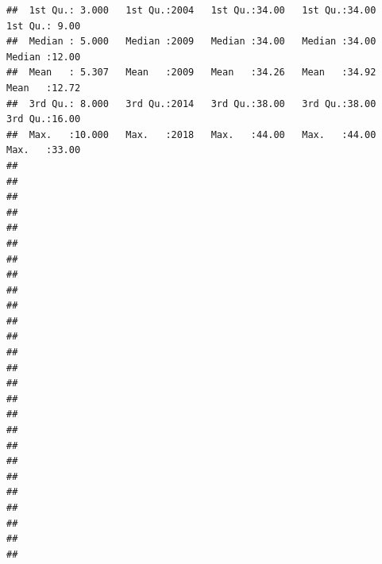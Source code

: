 \documentclass{article}\usepackage[]{graphicx}\usepackage[]{color}
\makeatletter
\newenvironment{kframe}{%
 \def\at@end@of@kframe{}%
 \ifinner\ifhmode%
  \def\at@end@of@kframe{\end{minipage}}%
  \begin{minipage}{\columnwidth}%
 \fi\fi%
 \def\FrameCommand##1{\hskip\@totalleftmargin \hskip-\fboxsep
 \colorbox{shadecolor}{##1}\hskip-\fboxsep
     \hskip-\linewidth \hskip-\@totalleftmargin \hskip\columnwidth}%
 \MakeFramed {\advance\hsize-\width
   \@totalleftmargin\z@ \linewidth\hsize
   \@setminipage}}%
 {\par\unskip\endMakeFramed%
 \at@end@of@kframe}
\newenvironment{knitrout}{}{} %
\makeatother
\begin{document}
\begin{knitrout}
\begin{kframe}
\begin{verbatim}
##  1st Qu.: 3.000   1st Qu.:2004   1st Qu.:34.00   1st Qu.:34.00   1st Qu.: 9.00  
##  Median : 5.000   Median :2009   Median :34.00   Median :34.00   Median :12.00  
##  Mean   : 5.307   Mean   :2009   Mean   :34.26   Mean   :34.92   Mean   :12.72  
##  3rd Qu.: 8.000   3rd Qu.:2014   3rd Qu.:38.00   3rd Qu.:38.00   3rd Qu.:16.00  
##  Max.   :10.000   Max.   :2018   Max.   :44.00   Max.   :44.00   Max.   :33.00  
##                                                                                 
##                                                                                 
##                                                                                 
##                                                                                 
##                                                                                 
##                                                                                 
##                                                                                 
##                                                                                 
##                                                                                 
##                                                                                 
##                                                                                 
##                                                                                 
##                                                                                 
##                                                                                 
##                                                                                 
##                                                                                 
##                                                                                 
##                                                                                 
##                                                                                 
##                                                                                 
##                                                                                 
##                                                                                 
##                                                                                 
##                                                                                 
##                                                                                 
##                                                                                 

\end{verbatim}
\end{kframe}
\end{knitrout}
\end{document}
